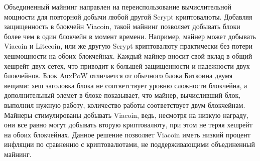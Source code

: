\documentclass{article}
\begin{document}
\cite{auxpow} Объединенный майнинг направлен на переиспользование вычислительной
мощности для повторной добычи любой другой Scrypt криптовалюты. Добавляя
защищенность в блокчейн Viacoin, такой майнинг позволяет добывать блоки более
чем в один блокчейн в момент времени. Например, майнер может добывать Viacoin и
Litecoin, или же другую Scrypt криптовалюту практически без потери хешмощности
на обоих блокчейнах.
\newline \newline \noindent
Каждый майнер вносит свой вклад в общий хешрейт двух сетех, что приводит к большей
защищенности и надежности двух блокчейнов. Блок AuxPoW отличается от обычного
блока Биткоина двумя вещами: хеш заголовка блока не соответствует уровню сложности
блокчейна, а дополнительный элемет в блоке показывает, что майнер, вычисливший блок,
выполнил нужную работу, количество работы соответствует двум блокчейнам.
\newline \newline \noindent
Майнеры стимулированы добывать Viacoin, ведь, несмотря на низкую награду, они
все равно могут добывать вторую криптовалюту, при этом не теряя хешрейт на обоих
блокчейнах. Данное решение позволяет Viacoin иметь низкий процент инфляции по
сравнению с криптовалютами, не поддерживающими объединенный майнинг.

\newpage
\end{document}
